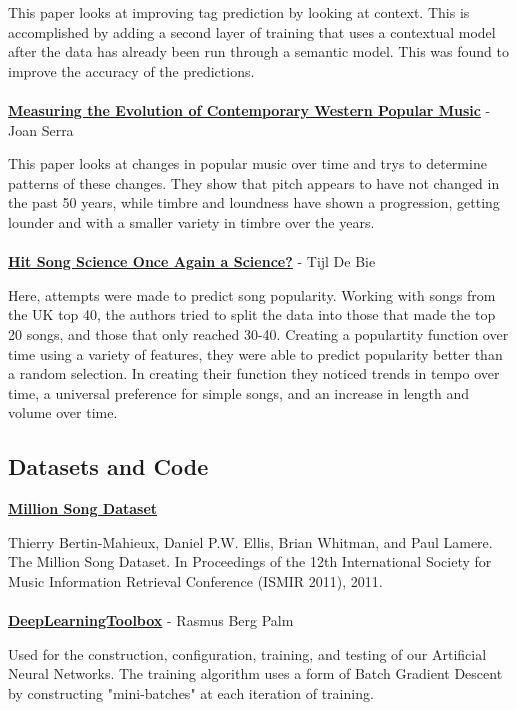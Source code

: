 \documentclass[12pt]{article}
\begin{document}
This paper looks at improving tag prediction by looking at context. This is accomplished by adding a second layer of training that uses a contextual model after the data has already been run through a semantic model. This was found to improve the accuracy of the predictions.
\\
\\
\href{http://www.nature.com/articles/srep00521}{\textbf{Measuring the Evolution of Contemporary Western Popular Music}} - Joan Serra

This paper looks at changes in popular music over time and trys to determine patterns of these changes. They show that pitch appears to have not changed in the past 50 years, while timbre and loundness have shown  a progression, getting lounder and with a smaller variety in timbre over the years.
\\
\\
\href{http://www.tijldebie.net/system/files/MML2011-final.pdf}{\textbf{Hit Song Science Once Again a Science?}} - Tijl De Bie

Here, attempts were made to predict song popularity. Working with songs from the UK top 40, the authors tried to split the data into those that made the top 20 songs, and those that only reached 30-40. Creating a populartity function over time using a variety of features, they were able to predict popularity better than a random selection. In creating their function they noticed trends in tempo over time, a universal preference for simple songs, and an increase in length and volume over time.
 
 
\subsection{Datasets and Code}
\label{subsec:datasetsAndCode}
\href{http://labrosa.ee.columbia.edu/millionsong/}{\textbf{Million Song Dataset}}

Thierry Bertin-Mahieux, Daniel P.W. Ellis, Brian Whitman, and Paul Lamere. 
The Million Song Dataset. In Proceedings of the 12th International Society
for Music Information Retrieval Conference (ISMIR 2011), 2011.
\\
\\
\href{https://github.com/rasmusbergpalm/DeepLearnToolbox}{\textbf{DeepLearningToolbox}} - Rasmus Berg Palm

Used for the construction, configuration, training, and testing of our Artificial Neural Networks. The training algorithm uses a form of Batch Gradient Descent by constructing "mini-batches" at each iteration of training.
\end{document}
